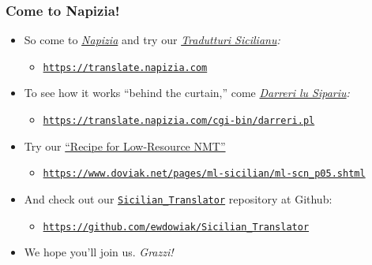 \documentclass{beamer}
\begin{document}
\begin{frame}
  \frametitle{Come to Napizia!}
  \vspace{-1.0em}
  \begin{itemize}
  \item So come to \href{https://www.napizia.com/index.shtml}{\textit{Napizia}} and try our
    \href{https://translate.napizia.com}{\textit{Tradutturi Sicilianu}}\textit{:}
    \begin{itemize}
    \item \footnotesize{\href{https://translate.napizia.com}{\texttt{https://translate.napizia.com}}}
    \end{itemize}
    \vspace{0.65em}
  \item To see how it works ``behind the curtain,'' come
    \href{https://translate.napizia.com/cgi-bin/darreri.pl}{\textit{Darreri lu Sipariu}}\textit{:}
    \begin{itemize}
    \item \footnotesize{\href{https://translate.napizia.com/cgi-bin/darreri.pl}{\texttt{https://translate.napizia.com/cgi-bin/darreri.pl}}}
    \end{itemize}
    \vspace{0.65em}
  \item Try our \href{https://www.doviak.net/pages/ml-sicilian/ml-scn_p05.shtml}{``Recipe for Low-Resource NMT''}
    \begin{itemize}
    \item \footnotesize{\href{https://www.doviak.net/pages/ml-sicilian/ml-scn_p05.shtml}{\texttt{https://www.doviak.net/pages/ml-sicilian/ml-scn\_p05.shtml}}}
    \end{itemize}
    \vspace{0.65em}
  \item And check out our \href{https://github.com/ewdowiak/Sicilian_Translator}{\texttt{Sicilian\_Translator}} repository at Github:
    \begin{itemize}
    \item \footnotesize{\href{https://github.com/ewdowiak/Sicilian_Translator}{\texttt{https://github.com/ewdowiak/Sicilian\_Translator}}}
    \end{itemize}
    \vspace{0.65em}
  \item We hope you'll join us. \textit{Grazzi!}
  \end{itemize}
\end{frame}


\end{document}
